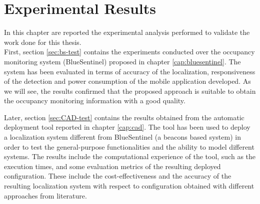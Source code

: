 %
%
\chapter{Experimental Results}
%
\label{cap:results}

In this chapter are reported the experimental analysis performed to validate the work done for this thesis.\\
First, section \ref{sec:bs-test} contains the experiments conducted over the occupancy monitoring system (BlueSentinel) proposed in chapter \ref{cap:bluesentinel}. The system has been evaluated in terms of accuracy of the localization, responsiveness of the detection and power consumption of the mobile application developed. As we will see, the results confirmed that the proposed approach is suitable to obtain the occupancy monitoring information with a good quality.

Later, section \ref{sec:CAD-test} contains the results obtained from the automatic deployment tool reported in chapter \ref{cap:cad}. The tool has been used to deploy a localization system different from BlueSentinel (a beacons based system) in order to test the general-purpose functionalities and the ability to model different systems. The results include the computational experience of the tool, such as the execution times, and some evaluation metrics of the resulting deployed configuration. These include the cost-effectiveness and the accuracy of the resulting localization system with respect to configuration obtained with different approaches from literature.

